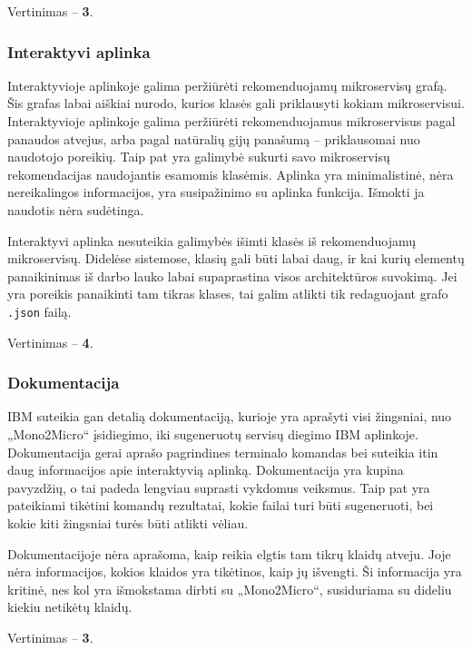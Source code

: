 \documentclass{VUMIFPSbakalaurinis}
\begin{document}
Vertinimas -- \textbf{3}.

\subsubsection{Interaktyvi aplinka}
Interaktyvioje aplinkoje galima peržiūrėti rekomenduojamų mikroservisų grafą. Šis grafas labai aiškiai nurodo, kurios klasės gali priklausyti kokiam mikroservisui. Interaktyvioje aplinkoje galima peržiūrėti rekomenduojamus mikroservisus pagal panaudos atvejus, arba pagal natūralių gijų panašumą -- priklausomai nuo naudotojo poreikių. Taip pat yra galimybė sukurti savo mikroservisų rekomendacijas naudojantis esamomis klasėmis. Aplinka yra minimalistinė, nėra nereikalingos informacijos, yra susipažinimo su aplinka funkcija. Išmokti ja naudotis nėra sudėtinga.

Interaktyvi aplinka nesuteikia galimybės išimti klasės iš rekomenduojamų mikroservisų. Didelėse sistemose, klasių gali būti labai daug, ir kai kurių elementų panaikinimas iš darbo lauko labai supaprastina visos architektūros suvokimą. Jei yra poreikis panaikinti tam tikras klases, tai galim atlikti tik redaguojant grafo \verb|.json| failą.

Vertinimas -- \textbf{4}.

\subsubsection{Dokumentacija}
IBM suteikia gan detalią dokumentaciją, kurioje yra aprašyti visi žingsniai, nuo „Mono2Micro“ įsidiegimo, iki sugeneruotų servisų diegimo IBM aplinkoje. Dokumentacija gerai aprašo pagrindines terminalo komandas bei suteikia itin daug informacijos apie interaktyvią aplinką. Dokumentacija yra kupina pavyzdžių, o tai padeda lengviau suprasti vykdomus veiksmus. Taip pat yra pateikiami tikėtini komandų rezultatai, kokie failai turi būti sugeneruoti, bei kokie kiti žingsniai turės būti atlikti vėliau.

Dokumentacijoje nėra aprašoma, kaip reikia elgtis tam tikrų klaidų atveju. Joje nėra informacijos, kokios klaidos yra tikėtinos, kaip jų išvengti. Ši informacija yra kritinė, nes kol yra išmokstama dirbti su „Mono2Micro“, susiduriama su dideliu kiekiu netikėtų klaidų.

Vertinimas -- \textbf{3}.
\end{document}
